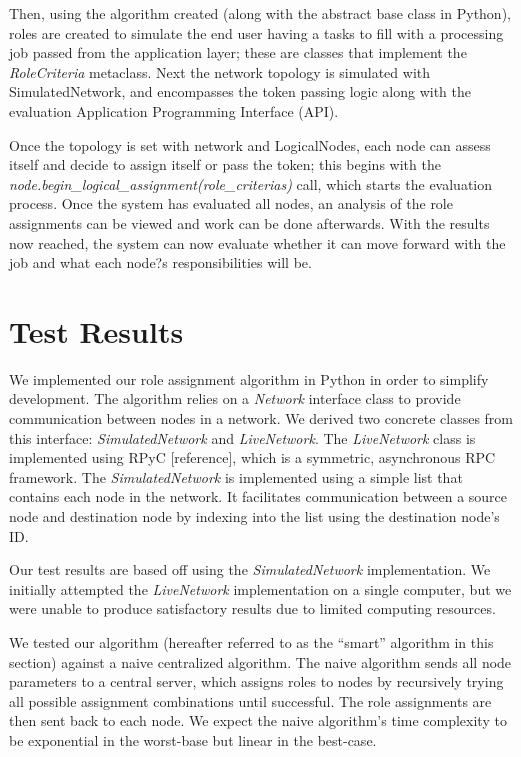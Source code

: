 \documentclass[11pt]{article}
\begin{document}
\begin{multicols}{2}
Then, using the algorithm created (along with the abstract base class in Python), roles are created to simulate the end user having a tasks to fill with a processing job passed from the application layer; these are classes that implement the \textit{RoleCriteria} metaclass.  Next the network topology is simulated with SimulatedNetwork, and encompasses the token passing logic along with the evaluation Application Programming Interface (API).

Once the topology is set with network and LogicalNodes, each node can assess itself and decide to assign itself or pass the token; this begins with the \textit{node.begin\_logical\_assignment(role\_criterias)} call, which starts the evaluation process.  Once the system has evaluated all nodes, an analysis of the role assignments can be viewed and work can be done afterwards.  With the results now reached, the system can now evaluate whether it can move forward with the job and what each node?s responsibilities will be.

\section{Test Results}

We implemented our role assignment algorithm in Python in order to simplify development. The algorithm relies on a \textit{Network} interface class to provide communication between nodes in a network. We derived two concrete classes from this interface: \textit{SimulatedNetwork} and \textit{LiveNetwork}. The \textit{LiveNetwork} class is implemented using RPyC [reference], which is a symmetric, asynchronous RPC framework. The \textit{SimulatedNetwork} is implemented using a simple list that contains each node in the network. It facilitates communication between a source node and destination node by indexing into the list using the destination node's ID.

Our test results are based off using the \textit{SimulatedNetwork} implementation. We initially attempted the \textit{LiveNetwork} implementation on a single computer, but we were unable to produce satisfactory results due to limited computing resources.

We tested our algorithm (hereafter referred to as the ``smart'' algorithm in this section) against a naive centralized algorithm. The naive algorithm sends all node parameters to a central server, which assigns roles to nodes by recursively trying all possible assignment combinations until successful. The role assignments are then sent back to each node. We expect the naive algorithm's time complexity to be exponential in the worst-base but linear in the best-case.


\end{multicols}
\end{document}
